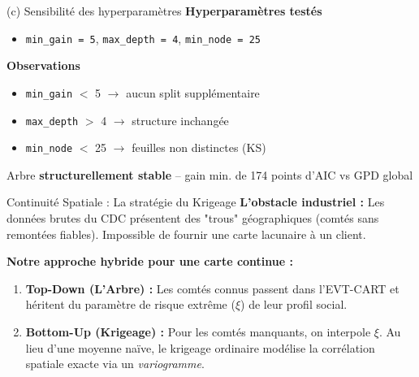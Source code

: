 \documentclass[10pt, aspectratio=1610]{beamer}
\begin{document}
\begin{frame}{(c) Sensibilité des hyperparamètres}
    \textbf{Hyperparamètres testés}
    \begin{itemize}
        \item \texttt{min\_gain = 5}, \texttt{max\_depth = 4}, \texttt{min\_node = 25}
    \end{itemize}

    \vspace{0.4cm}

    \textbf{Observations}
    \begin{itemize}
        \item \texttt{min\_gain} $<$ 5 $\rightarrow$ aucun split supplémentaire
        \item \texttt{max\_depth} $>$ 4 $\rightarrow$ structure inchangée
        \item \texttt{min\_node} $<$ 25 $\rightarrow$ feuilles non distinctes (KS)
    \end{itemize}

    \vspace{0.4cm}

    \begin{block}{}
        Arbre \textbf{structurellement stable} -- gain min. de 174 points d'AIC vs GPD global
    \end{block}
\end{frame}
\begin{frame}{Continuité Spatiale : La stratégie du Krigeage}
    \textbf{L'obstacle industriel :} Les données brutes du CDC présentent des "trous" géographiques (comtés sans remontées fiables). Impossible de fournir une carte lacunaire à un client.
    \vspace{0.3cm}

    \textbf{Notre approche hybride pour une carte continue :}
    \begin{enumerate}
        \item \textbf{Top-Down (L'Arbre) :} Les comtés connus passent dans l'EVT-CART et héritent du paramètre de risque extrême ($\xi$) de leur profil social.
        \item \textbf{Bottom-Up (Krigeage) :} Pour les comtés manquants, on interpole $\xi$. Au lieu d'une moyenne naïve, le krigeage ordinaire modélise la corrélation spatiale exacte via un \textit{variogramme}.
    \end{enumerate}
\end{frame}
\end{document}
